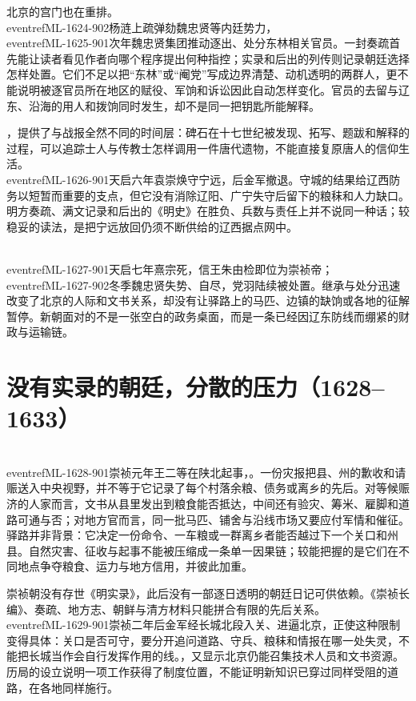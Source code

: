 北京的宫门也在重排。\\eventref{ML-1624-902}{杨涟上疏弹劾魏忠贤等内廷势力}，\\eventref{ML-1625-901}{次年魏忠贤集团推动逐出、处分东林相关官员}。一封奏疏首先能让读者看见作者向哪个程序提出何种指控；实录和后出的列传则记录朝廷选择怎样处置。它们不足以把“东林”或“阉党”写成边界清楚、动机透明的两群人，更不能说明被逐官员所在地区的赋役、军饷和诉讼因此自动怎样变化。官员的去留与辽东、沿海的用人和拨饷同时发生，却不是同一把钥匙所能解释。

，提供了与战报全然不同的时间层：碑石在十七世纪被发现、拓写、题跋和解释的过程，可以追踪士人与传教士怎样调用一件唐代遗物，不能直接复原唐人的信仰生活。\\eventref{ML-1626-901}{天启六年袁崇焕守宁远，后金军撤退}。守城的结果给辽西防务以短暂而重要的支点，但它没有消除辽阳、广宁失守后留下的粮秣和人力缺口。明方奏疏、满文记录和后出的《明史》在胜负、兵数与责任上并不说同一种话；较稳妥的读法，是把宁远放回仍须不断供给的辽西据点网中。

\\eventref{ML-1627-901}{天启七年熹宗死，信王朱由检即位为崇祯帝}；\\eventref{ML-1627-902}{冬季魏忠贤失势、自尽，党羽陆续被处置}。继承与处分迅速改变了北京的人际和文书关系，却没有让驿路上的马匹、边镇的缺饷或各地的征解暂停。新朝面对的不是一张空白的政务桌面，而是一条已经因辽东防线而绷紧的财政与运输链。

\section{没有实录的朝廷，分散的压力（1628--1633）}

\\eventref{ML-1628-901}{崇祯元年王二等在陕北起事}，。一份灾报把县、州的歉收和请赈送入中央视野，并不等于它记录了每个村落余粮、债务或离乡的先后。对等候赈济的人家而言，文书从县里发出到粮食能否抵达，中间还有验灾、筹米、雇脚和道路可通与否；对地方官而言，同一批马匹、铺舍与沿线市场又要应付军情和催征。驿路并非背景：它决定一份命令、一车粮或一群离乡者能否越过下一个关口和州县。自然灾害、征收与起事不能被压缩成一条单一因果链；较能把握的是它们在不同地点争夺粮食、运力与地方信用，并彼此加重。

崇祯朝没有存世《明实录》，此后没有一部逐日透明的朝廷日记可供依赖。《崇祯长编》、奏疏、地方志、朝鲜与清方材料只能拼合有限的先后关系。\\eventref{ML-1629-901}{崇祯二年后金军经长城北段入关、进逼北京}，正使这种限制变得具体：关口是否可守，要分开追问道路、守兵、粮秣和情报在哪一处失灵，不能把长城当作会自行发挥作用的线。，又显示北京仍能召集技术人员和文书资源。历局的设立说明一项工作获得了制度位置，不能证明新知识已穿过同样受阻的道路，在各地同样施行。

